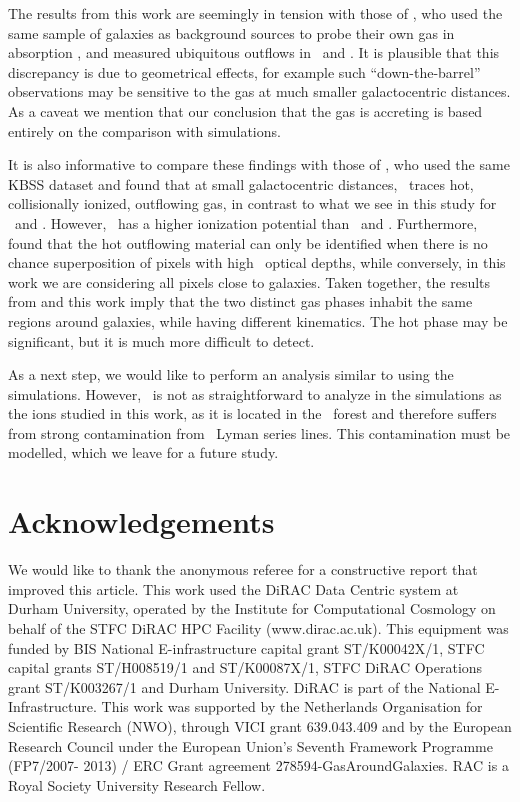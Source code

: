 \documentclass[useAMS,usenatbib,letterpaper]{mn2e}
\begin{document}
The results from this work are seemingly in tension with those of \citet{steidel10}, 
who used  the same sample of galaxies as background sources to probe their own gas
in absorption , and measured ubiquitous 
outflows in \cfour\ and \sifour.  It is plausible that this discrepancy is due
to geometrical effects, for example such ``down-the-barrel'' observations may be sensitive to the gas 
at much smaller galactocentric distances.
As a caveat we mention that our 
conclusion that the gas is accreting is based entirely on the comparison with simulations.

It is also informative to compare these findings with those of \citet{turner15},
who used the same KBSS dataset and found that at small galactocentric distances, 
\osix\ traces hot, collisionally ionized, outflowing gas, in contrast to what 
we see in this study for \cfour\ and \sifour. However, \osix\ has
a higher ionization potential than \cfour\ and \sifour. 
Furthermore, \citet{turner15} found that the hot outflowing material can only
be identified when there is no chance superposition of pixels with 
high \hone\ optical depths, while
conversely, in this work we are considering all pixels close to galaxies.
Taken together, the results from \citet{turner15} and 
this work imply that the two distinct gas phases inhabit the same 
regions around galaxies, while having different kinematics. 
The hot phase may be significant, but it is much more difficult to detect. 
 

As a next step, we would like to perform an analysis similar to \citet{turner15} 
using the simulations. 
However, \osix\ is not as straightforward to 
analyze in the simulations as the ions studied in this work, as it 
is located in the \lyb\ forest and therefore suffers
from strong contamination from \hone\ Lyman series lines. 
This contamination must be modelled, which we leave for a future study. 




\section*{Acknowledgements}

We would like to thank the anonymous
referee for a constructive report that improved this article. 
This work used the DiRAC Data Centric system at Durham University, 
operated by the Institute for Computational Cosmology on behalf of 
the STFC DiRAC HPC Facility (www.dirac.ac.uk). This equipment was 
funded by BIS National E-infrastructure capital grant ST/K00042X/1, 
STFC capital grants ST/H008519/1 and ST/K00087X/1, STFC DiRAC Operations 
grant ST/K003267/1 and Durham University. DiRAC is part of the National
E-Infrastructure. This work was supported by the Netherlands
Organisation for Scientific Research (NWO), through
VICI grant 639.043.409 and by the European Research Council
under the European Union's Seventh Framework Programme
(FP7/2007- 2013) / ERC Grant agreement 278594-GasAroundGalaxies.
RAC is a Royal Society University Research Fellow. 
\end{document}
